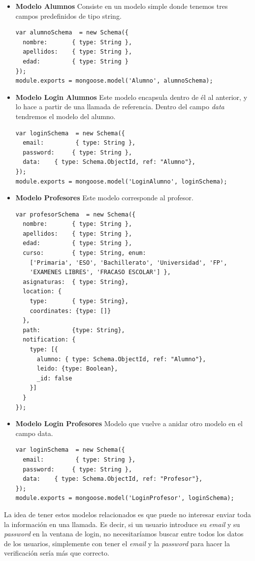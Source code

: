 \begin{itemize}
\item \textbf{Modelo Alumnos} Consiste en un modelo simple donde tenemos tres campos predefinidos de tipo string.
\begin{lstlisting}
var alumnoSchema  = new Schema({
  nombre:       { type: String },
  apellidos:    { type: String },
  edad:         { type: String }
});
module.exports = mongoose.model('Alumno', alumnoSchema);
\end{lstlisting}
\item  \textbf{Modelo Login Alumnos} Este modelo encapsula dentro de él al anterior, y lo hace a partir de una llamada de referencia. Dentro del campo \textit{data} tendremos el modelo del alumno.
\begin{lstlisting}
var loginSchema  = new Schema({
  email:         { type: String },
  password:     { type: String },
  data:    { type: Schema.ObjectId, ref: "Alumno"},
});
module.exports = mongoose.model('LoginAlumno', loginSchema);
\end{lstlisting}
\item  \textbf{Modelo Profesores} Este modelo corresponde al profesor.
\begin{lstlisting}
var profesorSchema  = new Schema({
  nombre:       { type: String },
  apellidos:    { type: String },
  edad:         { type: String },
  curso:        { type: String, enum:
    ['Primaria', 'ESO', 'Bachillerato', 'Universidad', 'FP',
    'EXAMENES LIBRES', 'FRACASO ESCOLAR'] },
  asignaturas:  { type: String},
  location: {
    type:       { type: String},
    coordinates: {type: []}
  },
  path:         {type: String},
  notification: {
    type: [{
      alumno: { type: Schema.ObjectId, ref: "Alumno"},
      leido: {type: Boolean},
      _id: false
    }]
  }
});
\end{lstlisting}
\item  \textbf{Modelo Login Profesores} Modelo que vuelve a anidar otro modelo en el campo data.

\begin{lstlisting}
var loginSchema  = new Schema({
  email:         { type: String },
  password:     { type: String },
  data:    { type: Schema.ObjectId, ref: "Profesor"},
});
module.exports = mongoose.model('LoginProfesor', loginSchema);
\end{lstlisting}
\end{itemize}
La idea de tener estos modelos relacionados es que puede no interesar enviar toda la información en una llamada. Es decir, si un usuario introduce su \textit{email} y su \textit{password} en la ventana de login, no necesitaríamos buscar entre todos los datos de los usuarios, simplemente con tener el \textit{email} y la \textit{password} para hacer la verificación sería más que correcto.

